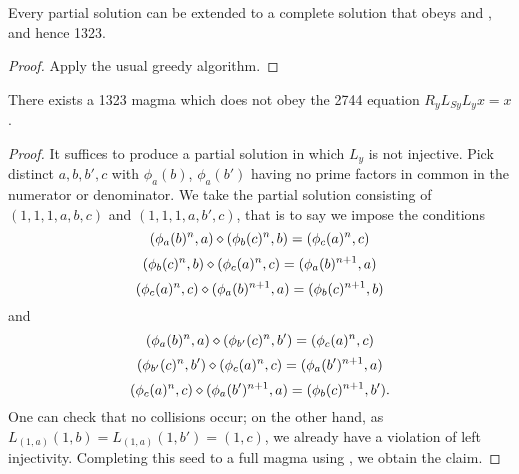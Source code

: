 \begin{corollary}\label{greedy-iterate}  Every partial solution can be extended to a complete solution that obeys  and , and hence 1323.
\end{corollary}

\begin{proof} Apply the usual greedy algorithm.
\end{proof}

\begin{corollary}\label{1323-refute-2744}  There exists a 1323 magma which does not obey the 2744 equation $R_y L_{Sy} L_y x = x$.
\end{corollary}

\begin{proof} It suffices to produce a partial solution in which $L_y$ is not injective. Pick distinct $a, b, b', c$ with $\phi_a(b)$, $\phi_a(b')$ having no prime factors in common in the numerator or denominator.  We take the partial solution consisting of $(1,1,1,a,b,c)$ and $(1,1,1,a,b',c)$, that is to say we impose the conditions
$$ (\phi_a(b)^n,a) \diamond (\phi_b(c)^n,b) = (\phi_c(a)^n,c)$$
$$ (\phi_b(c)^n,b) \diamond (\phi_c(a)^n,c) = (\phi_a(b)^{n+1}, a)$$
$$ (\phi_c(a)^n,c) \diamond (\phi_a(b)^{n+1}, a) = (\phi_b(c)^{n+1},b)$$
and
$$ (\phi_a(b)^n,a) \diamond (\phi_{b'}(c)^n,b') = (\phi_c(a)^n,c)$$
$$ (\phi_{b'}(c)^n,b') \diamond (\phi_c(a)^n,c) = (\phi_a(b')^{n+1}, a)$$
$$ (\phi_c(a)^n,c) \diamond (\phi_{a}(b')^{n+1}, a) = (\phi_b(c)^{n+1},b').$$
One can check that no collisions occur; on the other hand, as $L_{(1,a)} (1,b) = L_{(1,a)} (1,b') = (1,c)$, we already have a violation of left injectivity.  Completing this seed to a full magma using , we obtain the claim.
\end{proof}
